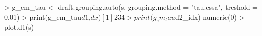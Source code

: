 \begin{CodeChunk}
\begin{CodeInput}


> g_em_tau <- draft.grouping.auto(s, grouping.method = "tau.cssa", treshold = 0.01)
> print(g_em_tau$d1_idx)
[1] 2 3 4
> print(g_em_tau$d2_idx)
numeric(0)
> plot.d1(s)
\end{CodeInput}

\end{CodeChunk}